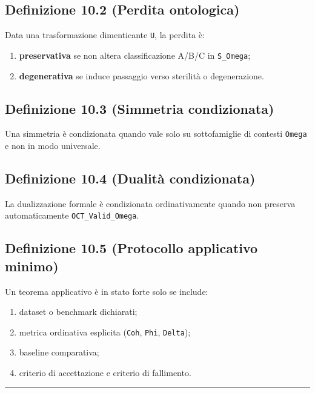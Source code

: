 \subsection{Definizione 10.2 (Perdita ontologica)}

Data una trasformazione dimenticante \texttt{U}, la perdita è:

\begin{enumerate}
\def\labelenumi{\arabic{enumi}.}
\tightlist
\item
  \textbf{preservativa} se non altera classificazione A/B/C in \texttt{S\_Omega};
\item
  \textbf{degenerativa} se induce passaggio verso sterilità o degenerazione.
\end{enumerate}

\subsection{Definizione 10.3 (Simmetria condizionata)}

Una simmetria è condizionata quando vale solo su sottofamiglie di contesti \texttt{Omega} e non in modo universale.

\subsection{Definizione 10.4 (Dualità condizionata)}

La dualizzazione formale è condizionata ordinativamente quando non preserva automaticamente \texttt{OCT\_Valid\_Omega}.

\subsection{Definizione 10.5 (Protocollo applicativo minimo)}

Un teorema applicativo è in stato forte solo se include:

\begin{enumerate}
\def\labelenumi{\arabic{enumi}.}
\tightlist
\item
  dataset o benchmark dichiarati;
\item
  metrica ordinativa esplicita (\texttt{Coh}, \texttt{Phi}, \texttt{Delta});
\item
  baseline comparativa;
\item
  criterio di accettazione e criterio di fallimento.
\end{enumerate}

\begin{center}\rule{0.5\linewidth}{0.5pt}\end{center}

